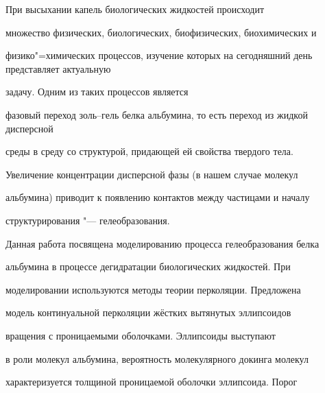 


\date{09/VI/2012} %









\maketitle






При высыхании капель биологических жидкостей происходит

множество физических, биологических, биофизических, биохимических и

физико"=химических процессов, изучение которых на сегодняшний день представляет  актуальную

задачу. Одним из таких процессов является

фазовый переход золь--гель белка альбумина, то есть переход из жидкой дисперсной

среды в среду со структурой, придающей ей свойства твердого тела.

Увеличение концентрации дисперсной фазы (в нашем случае молекул

альбумина) приводит к появлению контактов между частицами и началу

структурирования "--- гелеобразования.



Данная работа посвящена моделированию процесса гелеобразования белка

альбумина в процессе дегидратации биологических жидкостей. При

моделировании используются методы теории перколяции. Предложена

модель континуальной перколяции жёстких вытянутых эллипсоидов

вращения с проницаемыми оболочками. Эллипсоиды выступают

в роли молекул альбумина, вероятность молекулярного докинга молекул

характеризуется толщиной проницаемой оболочки эллипсоида. Порог

